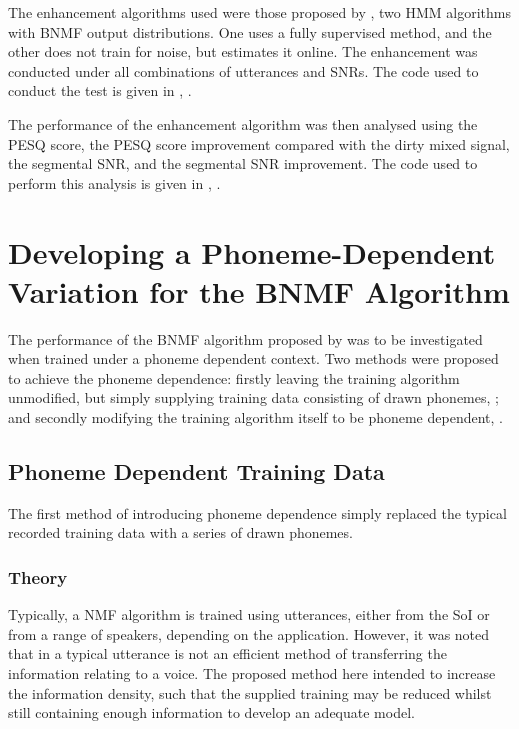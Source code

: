 The enhancement algorithms used were those proposed by \citet{mohammadiha2013supervised},
two \ac{HMM} algorithms with \ac{BNMF} output distributions. One
uses a fully supervised method, and the other does not train for noise,
but estimates it online. The enhancement was conducted under all combinations
of utterances and \acp{SNR}. The code used to conduct the test is
given in , \textit{}.

The performance of the enhancement algorithm was then analysed using
the \ac{PESQ} score, the \ac{PESQ} score improvement compared with
the dirty mixed signal, the segmental \ac{SNR}, and the segmental
\ac{SNR} improvement. The code used to perform this analysis is given
in , \textit{}.


\section{\label{sec:Develop-Phoneme-Dependent}Developing a Phoneme-Dependent
Variation for the \acl{BNMF} Algorithm}

The performance of the \ac{BNMF} algorithm proposed by \citet{mohammadiha2013supervised}
was to be investigated when trained under a phoneme dependent context.
Two methods were proposed to achieve the phoneme dependence: firstly
leaving the training algorithm unmodified, but simply supplying training
data consisting of drawn phonemes, \textbf{};
and secondly modifying the training algorithm itself to be phoneme
dependent, \textbf{}.


\subsection{\label{sub:Phoneme-Training}Phoneme Dependent Training Data}

The first method of introducing phoneme dependence simply replaced
the typical recorded training data with a series of drawn phonemes.


\subsubsection*{Theory}

Typically, a \ac{NMF} algorithm is trained using utterances, either
from the \ac{SoI} or from a range of speakers, depending on the application.
However, it was noted that in a typical utterance is not an efficient
method of transferring the information relating to a voice. The proposed
method here intended to increase the information density, such that
the supplied training may be reduced whilst still containing enough
information to develop an adequate model. 


